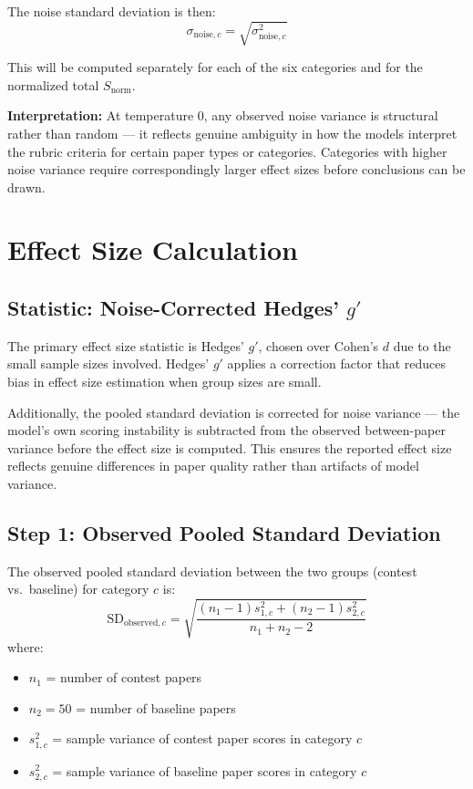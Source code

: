 \documentclass[11pt]{article}
\begin{document}
The noise standard deviation is then:
\begin{equation}
\sigma_{\text{noise},c} = \sqrt{\sigma^2_{\text{noise},c}}
\end{equation}

This will be computed separately for each of the six categories and for the normalized total $S_{\text{norm}}$.

\textbf{Interpretation:} At temperature 0, any observed noise variance is structural rather than random --- it reflects genuine ambiguity in how the models interpret the rubric criteria for certain paper types or categories. Categories with higher noise variance require correspondingly larger effect sizes before conclusions can be drawn.

\section{Effect Size Calculation}

\subsection{Statistic: Noise-Corrected Hedges' \texorpdfstring{$g'$}{g'}}

The primary effect size statistic is Hedges' $g'$, chosen over Cohen's $d$ due to the small sample sizes involved. Hedges' $g'$ applies a correction factor that reduces bias in effect size estimation when group sizes are small.

Additionally, the pooled standard deviation is corrected for noise variance --- the model's own scoring instability is subtracted from the observed between-paper variance before the effect size is computed. This ensures the reported effect size reflects genuine differences in paper quality rather than artifacts of model variance.

\subsection{Step 1: Observed Pooled Standard Deviation}

The observed pooled standard deviation between the two groups (contest vs.\ baseline) for category $c$ is:
\begin{equation}
\text{SD}_{\text{observed},c} = \sqrt{\frac{(n_1 - 1)s^2_{1,c} + (n_2 - 1)s^2_{2,c}}{n_1 + n_2 - 2}}
\end{equation}
where:
\begin{itemize}
    \item $n_1$ = number of contest papers
    \item $n_2 = 50$ = number of baseline papers
    \item $s^2_{1,c}$ = sample variance of contest paper scores in category $c$
    \item $s^2_{2,c}$ = sample variance of baseline paper scores in category $c$
\end{itemize}
\end{document}
